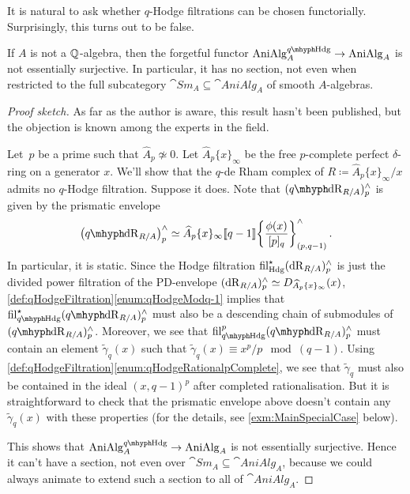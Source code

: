 \documentclass[DIV=12,numbers=enddot,leqno,bibliography=totoc]{scrartcl}
\begin{document}
	It is natural to ask whether $q$-Hodge filtrations can be chosen functorially. Surprisingly, this turns out to be false. 
	\begin{lem}\label{lem:NoFunctorialqHodgeFiltration}
		If $A$ is not a $\mathbb{Q}$-algebra, then the forgetful functor $\cat{AniAlg}_A^{\qHodge}\rightarrow \cat{AniAlg}_A$ is not essentially surjective. In particular, it has no section, not even when restricted to the full subcategory $\cat{Sm}_A\subseteq \cat{AniAlg}_A$ of smooth $A$-algebras.
	\end{lem}
	\begin{proof}[Proof sketch]
		As far as the author is aware, this result hasn't been published, but the objection is known among the experts in the field.
		
		Let~$p$ be a prime such that $\widehat{A}_p\not\simeq 0$. Let $\widehat{A}_p\{x\}_\infty$ be the free $p$-complete perfect $\delta$-ring on a generator $x$. We'll show that the $q$-de Rham complex of $R\coloneqq \widehat{A}_p\{x\}_\infty/x$ admits no $q$-Hodge filtration. Suppose it does. Note that $(\qdeRham_{R/A})_p^\complete$ is given by the prismatic envelope
		\begin{equation*}
			\bigl(\qdeRham_{R/A}\bigr)_p^\complete\simeq \widehat{A}_p\{x\}_\infty\qpower\left\{\frac{\phi(x)}{[p]_q}\right\}_{(p,q-1)}^\complete\,.
		\end{equation*}
		In particular, it is static. Since the Hodge filtration $\operatorname{fil}_{\mathrm{Hdg}}^\star(\mathrm{dR}_{R/A})_p^\wedge$ is just the divided power filtration of the PD-envelope $(\mathrm{dR}_{R/A})_p^\wedge\simeq D_{\smash{\widehat{A}}_p\{x\}_\infty}(x)$, \cref{def:qHodgeFiltration}\cref{enum:qHodgeModq-1} implies that $\fil_{\qHodge}^\star(\qdeRham_{R/A})_p^\complete$ must also be a descending chain of submodules of $(\qdeRham_{R/A})_p^\complete$. Moreover, we see that $\fil_{\qHodge}^p(\qdeRham_{R/A})_p^\complete$ must contain an element $\widetilde{\gamma}_q(x)$ such that $\widetilde{\gamma}_q(x)\equiv x^p/p\mod (q-1)$. Using \cref{def:qHodgeFiltration}\cref{enum:qHodgeRationalpComplete}, we see that $\widetilde{\gamma}_q$ must also be contained in the ideal $(x,q-1)^p$ after completed rationalisation. But it is straightforward to check that the prismatic envelope above doesn't contain any $\widetilde{\gamma}_q(x)$ with these properties (for the details, see \cref{exm:MainSpecialCase} below).
		
		This shows that $\cat{AniAlg}_A^{\qHodge}\rightarrow \cat{AniAlg}_A$ is not essentially surjective. Hence it can't have a section, not even over $\cat{Sm}_A\subseteq \cat{AniAlg}_A$, because we could always animate to extend such a section to all of $\cat{AniAlg}_A$.
	\end{proof}
	
\end{document}

